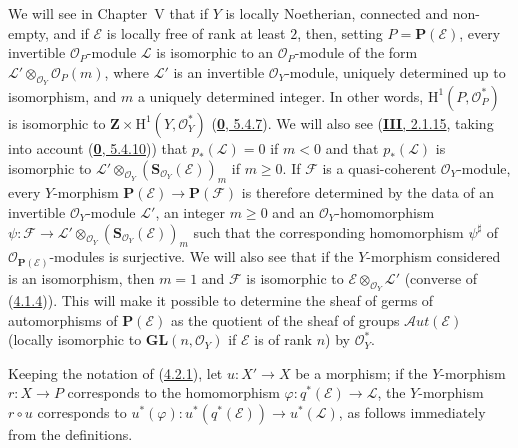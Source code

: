 \begin{remark}[4.2.7]
\label{II.4.2.7}
We will see in Chapter~V that if $Y$ is locally Noetherian, connected and non-empty,
and if $\mathcal{E}$ is locally free of rank at least $2$, then, setting
$P=\mathbf{P}(\mathcal{E})$, every invertible $\mathcal{O}_P$-module
$\mathcal{L}$ is isomorphic to an $\mathcal{O}_P$-module of the form
$\mathcal{L}'\otimes_{\mathcal{O}_Y}\mathcal{O}_P(m)$, where $\mathcal{L}'$ is
an invertible $\mathcal{O}_Y$-module, uniquely determined up to isomorphism,
and $m$ a uniquely determined integer. In other words,
$\mathrm{H}^1(P,\mathcal{O}_P^*)$ is isomorphic to
$\mathbf{Z}\times\mathrm{H}^1(Y,\mathcal{O}_Y^*)$
(\hyperref[0.5.4.7]{\textbf{0}, 5.4.7}). We will also see
(\hyperref[III.2.1.15]{\textbf{III}, 2.1.15}, taking into account
(\hyperref[0.5.4.10]{\textbf{0}, 5.4.10})) that
$p_*(\mathcal{L})=0$ if $m<0$ and that
$p_*(\mathcal{L})$ is isomorphic to
$\mathcal{L}'\otimes_{\mathcal{O}_Y}
(\mathbf{S}_{\mathcal{O}_Y}(\mathcal{E}))_m$ if $m\geq0$. If $\mathcal{F}$
is a quasi-coherent $\mathcal{O}_Y$-module, every $Y$-morphism
$\mathbf{P}(\mathcal{E})\to\mathbf{P}(\mathcal{F})$ is therefore determined by
the data of an invertible $\mathcal{O}_Y$-module $\mathcal{L}'$, an integer
$m\geq0$ and an $\mathcal{O}_Y$-homomorphism
$\psi:\mathcal{F}\to\mathcal{L}'\otimes_{\mathcal{O}_Y}
(\mathbf{S}_{\mathcal{O}_Y}(\mathcal{E}))_m$ such that the
corresponding homomorphism $\psi^\sharp$ of $\mathcal{O}_{\mathbf{P}(\mathcal{E})}$-modules
is surjective. We will also see that if the $Y$-morphism considered is an
isomorphism, then $m=1$ and $\mathcal{F}$ is isomorphic to
$\mathcal{E}\otimes_{\mathcal{O}_Y}\mathcal{L}'$ (converse of
(\hyperref[II.4.1.4]{4.1.4})). This will make it possible to determine the
sheaf of germs of automorphisms of $\mathbf{P}(\mathcal{E})$ as the quotient
of the sheaf of groups $\mathcal{A}ut(\mathcal{E})$ (locally isomorphic to
$\mathbf{GL}(n,\mathcal{O}_Y)$ if $\mathcal{E}$ is of rank $n$) by
$\mathcal{O}_Y^*$.
\end{remark}

\begin{env}[4.2.8]
\label{II.4.2.8}
Keeping the notation of (\hyperref[II.4.2.1]{4.2.1}), let
$u:X'\to X$ be a morphism; if the $Y$-morphism $r:X\to P$ corresponds to
the homomorphism $\varphi:q^*(\mathcal{E})\to\mathcal{L}$, the $Y$-morphism
$r\circ u$ corresponds to
$u^*(\varphi):u^*(q^*(\mathcal{E}))\to u^*(\mathcal{L})$, as follows
immediately from the definitions.
\end{env}

